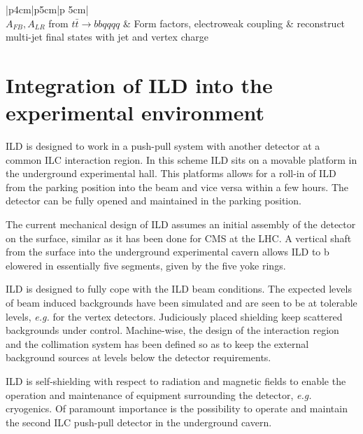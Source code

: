 \documentclass[%
 amsmath,amssymb,
 aps,
]{revtex4-1}
\begin{document}
\begin{table}[thb]
\begin{tabular}{|p{4cm}|p{5cm}|p {5cm}|}
\hline
{}\\
\hline
$A_{FB}, A_{LR}$ from $t \bar t \rightarrow bb qqqq$ & Form factors, electroweak coupling & reconstruct multi-jet final states with jet and vertex charge\\
\hline


    \end{tabular}
    \caption{Table of benchmark reactions which are used by ILD to optimize the detector performance. The channel, the physics motivation, and the main detector performance parameters are given.}
    \label{tab-benchmark}
\end{table}
\section{Integration of ILD into the experimental environment}
ILD is designed to work in a push-pull system with another detector at a common ILC interaction region. In this scheme ILD sits on a movable platform in the underground experimental hall. This platforms allows for a roll-in of ILD from the parking position into the beam and vice versa within a few hours. The detector can be fully opened and maintained in the parking position.

The current mechanical design of ILD assumes an initial assembly of the detector on the surface, similar as it has been done for CMS at the LHC. A vertical shaft from the surface into the underground experimental cavern allows ILD to b elowered in essentially five segments, given by the five yoke rings.

ILD is designed to fully cope with the ILD beam conditions. The expected levels of beam induced backgrounds have been simulated and are seen to be at tolerable levels, {\it e.g.} for the vertex detectors. Judiciously placed shielding keep scattered backgrounds under control. Machine-wise, the design of the interaction region and the collimation system has been defined so as to keep the external background sources at levels below the detector requirements.

ILD is self-shielding with respect to radiation and magnetic fields to enable the operation and maintenance of equipment surrounding the detector, {\it e.g.} cryogenics. Of paramount importance is the possibility to operate and maintain the second ILC push-pull detector in the underground cavern.
\end{document}
